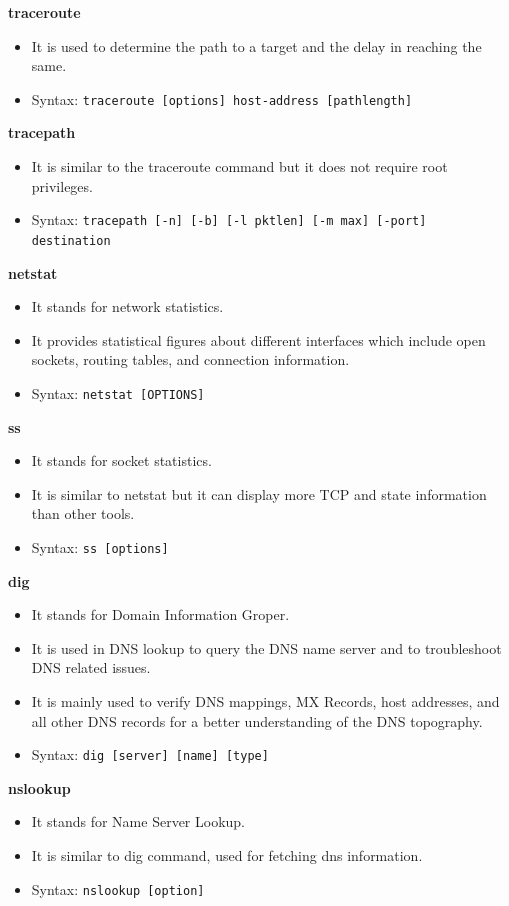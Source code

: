 \documentclass{article}
\begin{document}
\noindent\textbf{traceroute}
\begin{itemize}
    \item It is used to determine the path to a target and the delay in reaching the same.
    \item Syntax: \texttt{traceroute [options] host-address [pathlength]}
\end{itemize}

\noindent\textbf{tracepath}
\begin{itemize}
    \item It is similar to the traceroute command but it does not require root privileges.
    \item Syntax: \texttt{tracepath [-n] [-b] [-l pktlen] [-m max] [-port] destination}
\end{itemize}

\noindent\textbf{netstat}
\begin{itemize}
    \item It stands for network statistics.
    \item It provides statistical figures about different interfaces which include open sockets, routing tables, and connection information.
    \item Syntax: \texttt{netstat [OPTIONS]}
\end{itemize}

\noindent\textbf{ss}
\begin{itemize}
    \item It stands for socket statistics.
    \item It is similar to netstat but it can display more TCP and state information than other tools.
    \item Syntax: \texttt{ss [options]}
\end{itemize}

\noindent\textbf{dig}
\begin{itemize}
    \item It stands for Domain Information Groper.
    \item It is used in DNS lookup to query the DNS name server and to troubleshoot DNS related issues.
    \item It is mainly used to verify DNS mappings, MX Records, host addresses, and all other DNS records for a better understanding of the DNS topography.
    \item Syntax: \texttt{dig [server] [name] [type]}
\end{itemize}

\noindent\textbf{nslookup}
\begin{itemize}
    \item It stands for Name Server Lookup.
    \item It is similar to dig command, used for fetching dns information.
    \item Syntax: \texttt{nslookup [option]}
\end{itemize}
\end{document}
